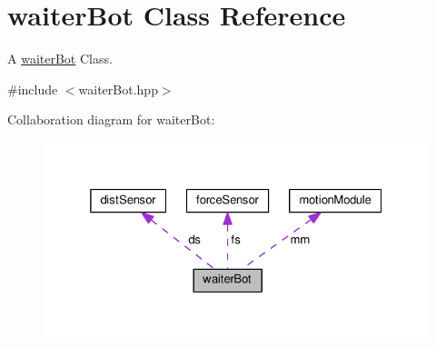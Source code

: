 \hypertarget{classwaiterBot}{}\section{waiter\+Bot Class Reference}
\label{classwaiterBot}


A \hyperlink{classwaiterBot}{waiter\+Bot} Class.  




{\ttfamily \#include $<$waiter\+Bot.\+hpp$>$}



Collaboration diagram for waiter\+Bot\+:
\nopagebreak
\begin{figure}[H]
\begin{center}
\leavevmode
\includegraphics[width=325pt]{classwaiterBot__coll__graph}
\end{center}
\end{figure}
